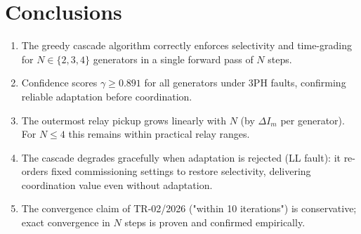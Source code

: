\documentclass[12pt,a4paper]{article}
\theoremstyle{definition}
\theoremstyle{plain}
\begin{document}
\section{Conclusions}
\label{sec:conc}

\begin{enumerate}
  \item The greedy cascade algorithm correctly enforces selectivity
        and time-grading for $N \in \{2, 3, 4\}$ generators in a single
        forward pass of $N$ steps.
  \item Confidence scores $\gamma \geq 0.891$ for all generators under 3PH
        faults, confirming reliable adaptation before coordination.
  \item The outermost relay pickup grows linearly with $N$ (by $\Delta I_m$
        per generator).  For $N \leq 4$ this remains within practical relay
        ranges.
  \item The cascade degrades gracefully when adaptation is rejected (LL
        fault): it re-orders fixed commissioning settings to restore
        selectivity, delivering coordination value even without adaptation.
  \item The convergence claim of TR-02/2026 ("within 10 iterations") is
        conservative; exact convergence in $N$ steps is proven and confirmed
        empirically.
\end{enumerate}


\end{document}
